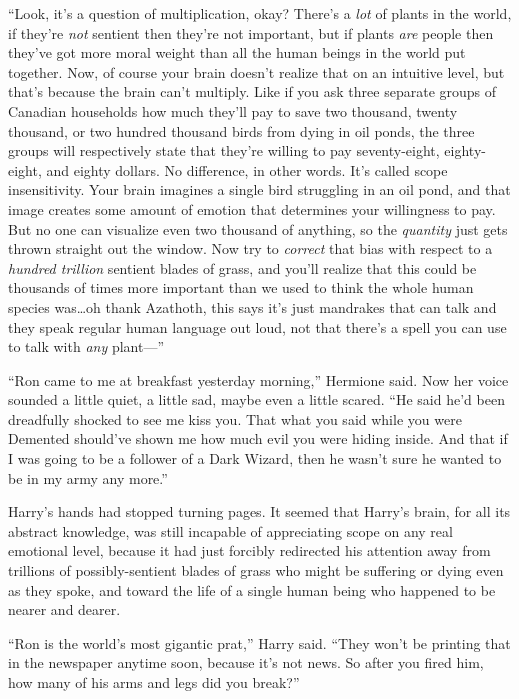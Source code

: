 “Look, it’s a question of multiplication, okay? There’s a \emph{lot} of plants in the world, if they’re \emph{not} sentient then they’re not important, but if plants \emph{are} people then they’ve got more moral weight than all the human beings in the world put together. Now, of course your brain doesn’t realize that on an intuitive level, but that’s because the brain can’t multiply. Like if you ask three separate groups of Canadian households how much they’ll pay to save two thousand, twenty thousand, or two hundred thousand birds from dying in oil ponds, the three groups will respectively state that they’re willing to pay seventy-eight, eighty-eight, and eighty dollars. No difference, in other words. It’s called scope insensitivity. Your brain imagines a single bird struggling in an oil pond, and that image creates some amount of emotion that determines your willingness to pay. But no one can visualize even two thousand of anything, so the \emph{quantity} just gets thrown straight out the window. Now try to \emph{correct} that bias with respect to a \emph{hundred trillion} sentient blades of grass, and you’ll realize that this could be thousands of times more important than we used to think the whole human species was…oh thank Azathoth, this says it’s just mandrakes that can talk and they speak regular human language out loud, not that there’s a spell you can use to talk with \emph{any} plant—”

“Ron came to me at breakfast yesterday morning,” Hermione said. Now her voice sounded a little quiet, a little sad, maybe even a little scared. “He said he’d been dreadfully shocked to see me kiss you. That what you said while you were Demented should’ve shown me how much evil you were hiding inside. And that if I was going to be a follower of a Dark Wizard, then he wasn’t sure he wanted to be in my army any more.”

Harry’s hands had stopped turning pages. It seemed that Harry’s brain, for all its abstract knowledge, was still incapable of appreciating scope on any real emotional level, because it had just forcibly redirected his attention away from trillions of possibly-sentient blades of grass who might be suffering or dying even as they spoke, and toward the life of a single human being who happened to be nearer and dearer.

“Ron is the world’s most gigantic prat,” Harry said. “They won’t be printing that in the newspaper anytime soon, because it’s not news. So after you fired him, how many of his arms and legs did you break?”

